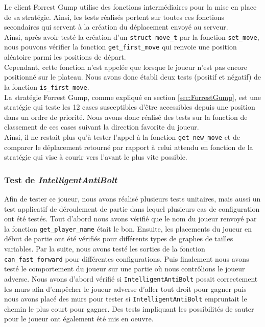 \documentclass[11pt]{article}
\begin{document}
Le client Forrest Gump utilise des fonctions intermédiaires pour la mise en place de sa stratégie. Ainsi, les tests réalisés portent sur toutes ces fonctions secondaires qui servent à la création du déplacement envoyé au serveur. \\

Ainsi, après avoir testé la création d'un \texttt{struct move\_t} par la fonction \texttt{set\_move}, nous pouvons vérifier la fonction \texttt{get\_first\_move} qui renvoie une position aléatoire parmi les positions de départ. \\
Cependant, cette fonction n'est appelée que lorsque le joueur n'est pas encore positionné sur le plateau. Nous avons donc établi deux tests (positif et négatif) de la fonction \texttt{is\_first\_move}. \\

La stratégie Forrest Gump, comme expliqué en section \ref{sec:ForrestGump}, est une stratégie qui teste les 12 cases susceptibles d'être accessibles depuis une position dans un ordre de priorité. Nous avons donc réalisé des tests sur la fonction de classement de ces cases suivant la direction favorite du joueur. \\
Ainsi, il ne restait plus qu'à tester l'appel à la fonction \texttt{get\_new\_move} et de comparer le déplacement retourné par rapport à celui attendu en fonction de la stratégie qui vise à courir vers l'avant le plus vite possible.

\subsubsection{Test de \textit{IntelligentAntiBolt}}

Afin de tester ce joueur, nous avons réalisé plusieurs tests unitaires, mais aussi un test applicatif de déroulement de partie dans lequel plusieurs cas de configuration ont été testés. Tout d'abord nous avons vérifié que le nom du joueur renvoyé par la fonction \texttt{get\_player\_name} était le bon. Ensuite, les placements du joueur en début de partie ont été vérifiés pour différents types de graphes de tailles variables. Par la suite, nous avons testé les sorties de la fonction \texttt{can\_fast\_forward} pour différentes configurations. Puis finalement nous avons testé le comportement du joueur sur une partie où nous contrôlions le joueur adverse. Nous avons d'abord vérifié si \texttt{IntelligentAntiBolt} posait correctement les murs afin d'empêcher le joueur adverse d'aller tout droit pour gagner puis nous avons placé des murs pour tester si \texttt{IntelligentAntiBolt} empruntait le chemin le plus court pour gagner. Des tests impliquant les possibilités de sauter pour le joueur ont également été mis en oeuvre.
\end{document}
